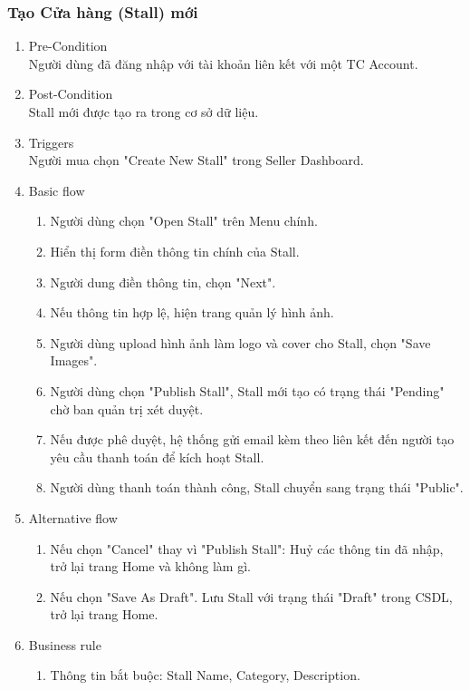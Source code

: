 \subsubsection{Tạo Cửa hàng (Stall) mới}
\begin{enumerate}
	\item Pre-Condition\\
	Người dùng đã đăng nhập với tài khoản liên kết với một TC Account.
	\item Post-Condition\\
	Stall mới được tạo ra trong cơ sở dữ liệu.
	\item Triggers\\
	Người mua chọn "Create New Stall" trong Seller Dashboard.
	\item Basic flow
	\begin{enumerate}
		\item Người dùng chọn "Open Stall" trên Menu chính.
		\item Hiển thị form điền thông tin chính của Stall.
		\item Người dung điền thông tin, chọn "Next".
		\item Nếu thông tin hợp lệ, hiện trang quản lý hình ảnh.
		\item Người dùng upload hình ảnh làm logo và cover cho Stall, chọn "Save Images".
		\item Người dùng chọn "Publish Stall", Stall mới tạo có trạng thái "Pending" chờ ban quản trị xét duyệt.
		\item Nếu được phê duyệt, hệ thống gửi email kèm theo liên kết đến người tạo yêu cầu thanh toán để kích hoạt Stall.
		\item Người dùng thanh toán thành công, Stall chuyển sang trạng thái "Public".
	\end{enumerate}
	\item Alternative flow
	\begin{enumerate}
		\item Nếu chọn "Cancel" thay vì "Publish Stall": Huỷ các thông tin đã nhập, trở lại trang Home và không làm gì.
		\item Nếu chọn "Save As Draft". Lưu Stall với trạng thái "Draft" trong CSDL, trở lại trang Home.
	\end{enumerate}
	\item Business rule
	\begin{enumerate}
		\item Thông tin bắt buộc: Stall Name, Category, Description.
	\end{enumerate}
\end{enumerate}

